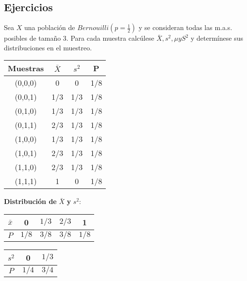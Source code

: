 \subsection{Ejercicios}
\begin{problem}{2.1}
Sea $X$ una población de $Bernouilli(p = \frac{1}{2})$ y se consideran todas las m.a.s. posibles de tamaño 3. Para cada muestra calcúlese $\bar{X}, s^2, \mu y S^2$ y determínese sus distribuciones en el muestreo.
\end{problem}
\begin{sol}
	\begin{center}
		\begin{tabular}{c c c c}
			\toprule
			\textbf{Muestras} & $\bar{X}$ & $s^2$ & P   \\
			\midrule
			(0,0,0)           & 0         & 0     & 1/8 \\
			(0,0,1)           & 1/3       & 1/3   & 1/8 \\
			(0,1,0)           & 1/3       & 1/3   & 1/8 \\
			(0,1,1)           & 2/3       & 1/3   & 1/8 \\
			(1,0,0)           & 1/3       & 1/3   & 1/8 \\
			(1,0,1)           & 2/3       & 1/3   & 1/8 \\
			(1,1,0)           & 2/3       & 1/3   & 1/8 \\
			(1,1,1)           & 1         & 0     & 1/8 \\
			\bottomrule
		\end{tabular}
	\end{center}

	\vspace{0.1cm} %

	\textbf{Distribución de} $\bar{X}$ \textbf{y} $s^2$:

	\vspace{0cm} %

	\begin{center}
		\begin{tabular}{c|cccc}
			$\bar{x}$ & 0     & $1/3$ & $2/3$ & 1     \\
			\hline
			$P$       & $1/8$ & $3/8$ & $3/8$ & $1/8$ \\
		\end{tabular}
		\hspace{1cm} %
		\begin{tabular}{c|cc}
			$s^2$ & 0     & $1/3$ \\
			\hline
			$P$   & $1/4$ & $3/4$ \\
		\end{tabular}
	\end{center}
\end{sol}
